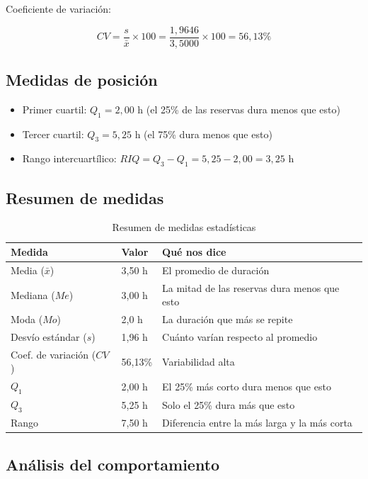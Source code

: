 \documentclass[12pt,a4paper]{article}
\begin{document}
Coeficiente de variación:

\vspace{4pt}
$$CV = \frac{s}{\bar{x}} \times 100 = \frac{1{,}9646}{3{,}5000} \times 100 = 56{,}13\%$$

\subsection{Medidas de posición}

\begin{itemize}[itemsep=6pt]
  \item Primer cuartil: $Q_1 = 2{,}00$ h (el 25\% de las reservas dura menos que esto)
  \item Tercer cuartil: $Q_3 = 5{,}25$ h (el 75\% dura menos que esto)
  \item Rango intercuartílico: $RIQ = Q_3 - Q_1 = 5{,}25 - 2{,}00 = 3{,}25$ h
\end{itemize}

\subsection{Resumen de medidas}

\begin{table}[H]
\centering
\caption{Resumen de medidas estadísticas}
\vspace{4pt}
\begin{tabular}{lll}
\toprule
\textbf{Medida} & \textbf{Valor} & \textbf{Qué nos dice} \\
\midrule
Media ($\bar{x}$) & 3,50 h & El promedio de duración \\[4pt]
Mediana ($Me$) & 3,00 h & La mitad de las reservas dura menos que esto \\[4pt]
Moda ($Mo$) & 2,0 h & La duración que más se repite \\[4pt]
Desvío estándar ($s$) & 1,96 h & Cuánto varían respecto al promedio \\[4pt]
Coef. de variación ($CV$) & 56,13\% & Variabilidad alta \\[4pt]
$Q_1$ & 2,00 h & El 25\% más corto dura menos que esto \\[4pt]
$Q_3$ & 5,25 h & Solo el 25\% dura más que esto \\[4pt]
Rango & 7,50 h & Diferencia entre la más larga y la más corta \\
\bottomrule
\end{tabular}
\end{table}

\subsection{Análisis del comportamiento}
\end{document}
